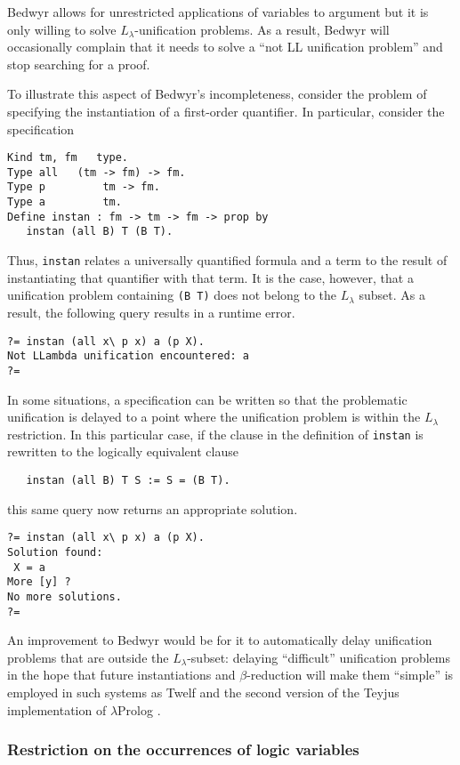\documentclass{article}
\newcommand{\lp}{$\lambda$Prolog}
\newcommand{\Ll}{$L_\lambda$}
\begin{document}
Bedwyr allows for unrestricted applications of variables to argument
but it is only willing to solve \Ll-unification problems.  As a result,
Bedwyr will occasionally complain that it needs to solve a ``not LL
unification problem'' and stop searching for a proof.

To illustrate this aspect of Bedwyr's incompleteness, consider the
problem of specifying the instantiation of a first-order quantifier.
In particular, consider the specification
\begin{verbatim}
Kind tm, fm   type.
Type all   (tm -> fm) -> fm.
Type p         tm -> fm.
Type a         tm.
Define instan : fm -> tm -> fm -> prop by
   instan (all B) T (B T).
\end{verbatim}
Thus, {\tt instan} relates a universally quantified formula and a term
to the result of instantiating that quantifier with that term.
It is the case, however, that a
unification problem containing \verb+(B T)+ does not belong to the
\Ll{} subset.
As a result, the following query results in a runtime error.
\begin{verbatim}
?= instan (all x\ p x) a (p X).
Not LLambda unification encountered: a
?=
\end{verbatim}
In some situations, a specification can be written so that the
problematic unification is delayed to a point where the unification
problem is within the \Ll{} restriction.  In this particular case, if
the clause in the definition of {\tt instan} is rewritten to the
logically equivalent clause
\begin{verbatim}
   instan (all B) T S := S = (B T).
\end{verbatim}
this same query now returns an appropriate solution.
\begin{verbatim}
?= instan (all x\ p x) a (p X).
Solution found:
 X = a
More [y] ? 
No more solutions.
?=
\end{verbatim}
An improvement to Bedwyr would be for it to automatically delay
unification problems that are outside the \Ll-subset: delaying
``difficult'' unification problems in the hope that future
instantiations and $\beta$-reduction will make them ``simple'' is
employed in such systems as Twelf and the second version of the Teyjus
implementation of \lp{} \cite{teyjus.website}. 

\subsubsection{Restriction on the occurrences of logic variables}
\label{restrict-logic-variables}
\end{document}
